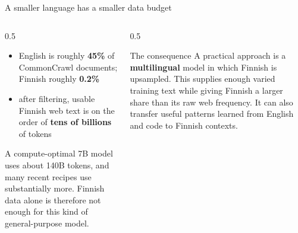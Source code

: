 \documentclass[aspectratio=169,10pt]{beamer}
\begin{document}
\begin{frame}{A smaller language has a smaller data budget}
  \begin{columns}[T]
    \begin{column}{0.5\textwidth}
      \begin{itemize}
        \item English is roughly \textbf{45\%} of CommonCrawl documents;
          Finnish roughly \textbf{0.2\%}
        \item after filtering, usable Finnish web text is on the order of
          \textbf{tens of billions} of tokens
      \end{itemize}
      \vspace{0.4em}

      A compute-optimal 7B model uses about 140B tokens, and many recent
      recipes use substantially more. Finnish data alone is therefore not
      enough for this kind of general-purpose model.
    \end{column}
    \begin{column}{0.5\textwidth}
      \begin{block}{The consequence}
        \small
        A practical approach is a \textbf{multilingual} model in which Finnish
        is upsampled.
        \vspace{0.4em}
        This supplies enough varied training text while giving Finnish a larger
        share than its raw web frequency.
        \vspace{0.4em}
        It can also transfer useful patterns learned from English and code to
        Finnish contexts.
      \end{block}
    \end{column}
  \end{columns}
\end{frame}
\end{document}
